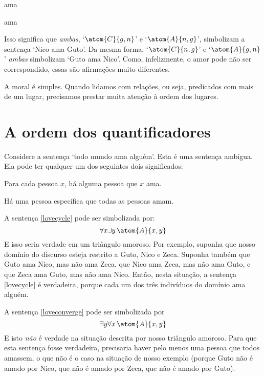 \begin{center}
	\begin{ekey}
		\item[\atom{A}{x,y}]  ama 
		\item[\atom{C}{x,y}]  ama 
	\end{ekey}
\end{center}
Isso significa que \emph{ambas}, `$\atom{C}{g,n}$' e `$\atom{A}{n,g}$',  simbolizam a sentença `Nico ama Guto'.
Da mesma forma, `$\atom{C}{n,g}$' e `$\atom{A}{g,n}$'
\emph{ambas} simbolizam `Guto ama Nico'.
Como, infelizmente, o amor pode não ser correspondido, essas são afirmações muito diferentes.

A moral é simples. Quando lidamos com relações, ou seja, predicados com mais de um lugar, precisamos prestar muita atenção à ordem dos lugares.


\section{A ordem dos quantificadores}
Considere a sentença `todo mundo ama alguém'.
Esta é uma sentença ambígua.
Ela pode ter qualquer um dos seguintes dois significados:
	\begin{earg}
		\item[\ex{lovecycle}] Para cada pessoa $x$, há alguma pessoa que $x$ ama.
		\item[\ex{loveconverge}] Há uma pessoa específica que todas as pessoas amam.
	\end{earg}
A sentença \ref{lovecycle} pode ser simbolizada por:
$$\forall x \exists y\, \atom{A}{x,y}$$
E isso seria verdade em um triângulo amoroso.
Por exemplo, suponha que nosso domínio do discurso esteja restrito a Guto, Nico e Zeca.
Suponha também que Guto ama Nico, mas não ama Zeca, que Nico ama Zeca, mas não ama Guto, e que Zeca ama Guto, mas não ama Nico.
Então, nesta situação, a sentença \ref{lovecycle} é verdadeira, porque cada um dos três indivíduos do domínio ama alguém.

A sentença \ref{loveconverge} pode ser simbolizada por
$$\exists y \forall x\, \atom{A}{x,y}$$
E isto \emph{não} é verdade na situação descrita por nosso triângulo amoroso.
Para que esta sentença fosse verdadeira, precisaria haver pelo menos uma pessoa que todos amassem, o que não é o caso na situação de nosso exemplo (porque Guto não é amado por Nico, que não é amado por Zeca, que não é amado por Guto).

